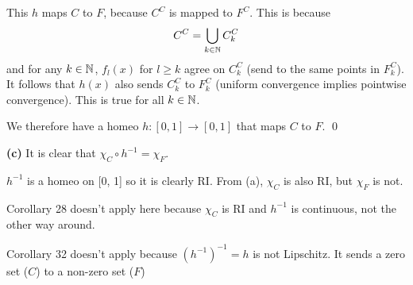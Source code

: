 \documentclass[a4paper, 12pt]{article}
\begin{document}
\begin{solution}
    This $h$ maps $C$ to $F$, because $C^C$ is mapped to $F^C$. This is because
    \[
        C^C = \bigcup_{k \in \mathbb{N}} C_k^C
    \]
    and for any $k \in \mathbb{N}$, $f_l(x)$ for $l \geq k$ agree on $C_k^C$ (send to the same points in $F_k^C$). It follows that $h(x)$ also sends $C_k^C$ to $F_k^C$ (uniform convergence implies pointwise convergence). This is true for all $k \in \mathbb{N}$.

    We therefore have a homeo $h: [0, 1] \to [0, 1]$ that maps $C$ to $F$. \qed

    \textbf{(c)} It is clear that $\chi_C \circ h^{-1} = \chi_F$.

    $h^{-1}$ is a homeo on [0, 1] so it is clearly RI. From (a), $\chi_C$ is also RI, but $\chi_F$ is not.

    Corollary 28 doesn't apply here because $\chi_C$ is RI and $h^{-1}$ is continuous, not the other way around.

    Corollary 32 doesn't apply because $(h^{-1})^{-1} = h$ is not Lipschitz. It sends a zero set ($C$) to a non-zero set ($F$)
\end{solution}
\end{document}
